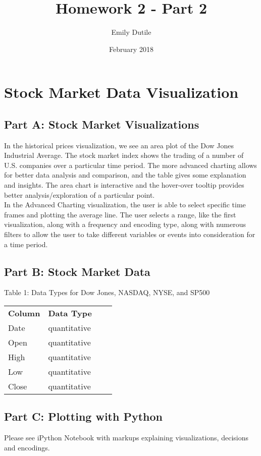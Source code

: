 \documentclass{neu_handout}
\title{Homework 2 - Part 2}
\author{Emily Dutile}
\date{February 2018}
\begin{document}
\section*{Stock Market Data Visualization}

\subsection*{Part A: Stock Market Visualizations}
In the historical prices visualization, we see an area plot of the Dow Jones Industrial Average. The stock market index shows the trading of a number of U.S. companies over a particular time period. The more advanced charting allows for better data analysis and comparison, and the table gives some explanation and insights. The area chart is interactive and the hover-over tooltip provides better analysis/exploration of a particular point.\\

In the Advanced Charting visualization, the user is able to select specific time frames and plotting the average line. The user selects a range, like the first visualization, along with a frequency and encoding type, along with numerous filters to allow the user to take different variables or events into consideration for a time period.

\subsection*{Part B: Stock Market Data}

\begin{center}
Table 1: Data Types for Dow Jones, NASDAQ, NYSE, and SP500
\end{center}
\begin{center} 
\begin{tabular}[h]{l l l l}
\textbf{Column} & \textbf{Data Type} \\
Date & quantitative \\
Open & quantitative \\ 
High & quantitative \\
Low & quantitative \\
Close & quantitative \\

\end{tabular}
\end{center}

\subsection*{Part C: Plotting with Python}
Please see iPython Notebook with markups explaining visualizations, decisions and encodings.
\end{document}

